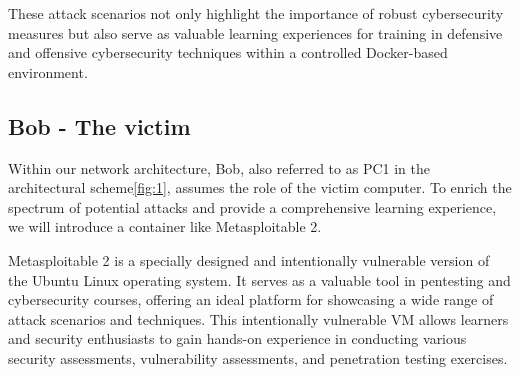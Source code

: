 \documentclass[a4paper,11pt,singlespacing]{article}
\begin{document}
These attack scenarios not only highlight the importance of robust cybersecurity measures but also serve as valuable learning experiences for training in defensive and offensive cybersecurity techniques within a controlled Docker-based environment.

\subsection{Bob - The victim}

Within our network architecture, Bob, also referred to as PC1 in the architectural scheme\ref{fig:1}, assumes the role of the victim computer. To enrich the spectrum of potential attacks and provide a comprehensive learning experience, we will introduce a container like Metasploitable 2.
\par
Metasploitable 2 is a specially designed and intentionally vulnerable version of the Ubuntu Linux operating system. It serves as a valuable tool in pentesting and cybersecurity courses, offering an ideal platform for showcasing a wide range of attack scenarios and techniques. This intentionally vulnerable VM allows learners and security enthusiasts to gain hands-on experience in conducting various security assessments, vulnerability assessments, and penetration testing exercises.
\end{document}
